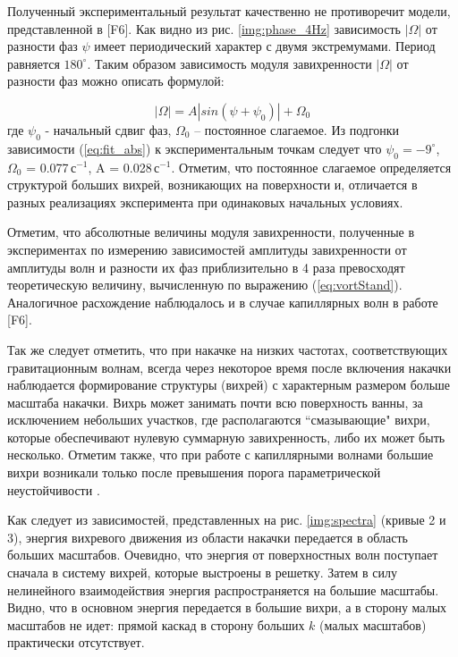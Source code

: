 Полученный экспериментальный результат качественно не противоречит модели, представленной в [F6]. Как видно из рис. \ref{img:phase_4Hz} зависимость $|\Omega|$ от разности фаз $\psi$ имеет периодический характер с двумя экстремумами. Период равняется $180^\circ$. Таким образом зависимость модуля завихренности $|\Omega|$ от разности фаз можно описать формулой: 

\begin{equation}\label{eq:fit_abs}
|\Omega| = A |sin(\psi+\psi_0)| + \Omega_0
\end{equation}
где $\psi_0$ - начальный сдвиг фаз, $\Omega_0$ – постоянное слагаемое. Из подгонки зависимости (\ref{eq:fit_abs}) к экспериментальным точкам следует что $\psi_0 = -9^\circ$, $\Omega_0$ = 0.077\,с$^{-1}$, A = 0.028\,с$^{-1}$. Отметим, что постоянное слагаемое определяется структурой больших вихрей, возникающих на поверхности и, отличается в разных реализациях эксперимента при одинаковых начальных условиях. 

Отметим, что абсолютные величины модуля завихренности, полученные в экспериментах по измерению зависимостей амплитуды завихренности от амплитуды волн и разности их фаз приблизительно в 4 раза превосходят теоретическую величину, вычисленную по выражению (\ref{eq:vortStand}). Аналогичное расхождение наблюдалось и в случае капиллярных волн в работе [F6]. 

Так же следует отметить, что при накачке на низких частотах, соответствующих гравитационным волнам, всегда через некоторое время после включения накачки наблюдается формирование структуры (вихрей) с характерным размером больше масштаба накачки. Вихрь может занимать почти всю поверхность ванны, за исключением небольших участков, где располагаются ``смазывающие" вихри, которые обеспечивают нулевую суммарную завихренность, либо их может быть несколько. Отметим также, что при работе с капиллярными волнами большие вихри возникали только после превышения порога параметрической неустойчивости \cite{Francois2013}. 

Как следует из зависимостей, представленных на рис. \ref{img:spectra} (кривые 2 и 3), энергия вихревого движения из области накачки передается в область больших масштабов. Очевидно, что энергия от поверхностных волн поступает сначала в систему вихрей, которые выстроены в решетку. Затем в силу нелинейного взаимодействия энергия распространяется на большие масштабы. Видно, что в основном энергия передается в большие вихри, а в сторону малых масштабов не идет: прямой каскад в сторону больших $k$ (малых масштабов) практически отсутствует.

